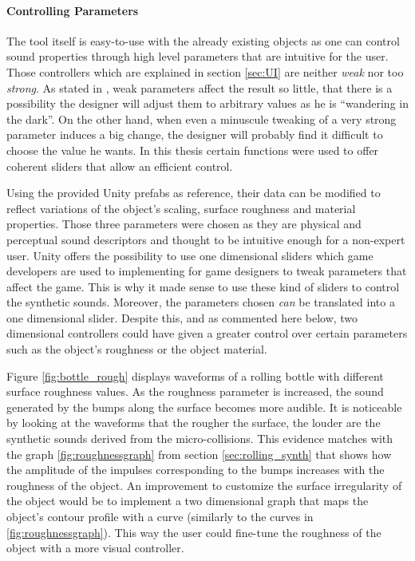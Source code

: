 \paragraph{Controlling Parameters}
\hfill \break

The tool itself is easy-to-use with the already existing objects as one can control sound properties through high level parameters that are intuitive for the user. Those controllers which are explained in section \ref{sec:UI} are neither \textit{weak} nor too \textit{strong}. As stated in \cite{jaffe1995ten}, weak parameters affect the result so little, that there is a possibility the designer will adjust them to arbitrary values as he is ``wandering in the dark''. On the other hand, when even a minuscule tweaking of a very strong parameter induces a big change, the designer will probably find it difficult to choose the value he wants. In this thesis certain functions were used to offer coherent sliders that allow an efficient control.

Using the provided Unity\textsuperscript{\textregistered} prefabs as reference, their data can be modified to reflect variations of the object's scaling, surface roughness and material properties. Those three parameters were chosen as they are physical and perceptual sound descriptors \cite{aramaki2009thinking} and thought to be intuitive enough for a non-expert user. Unity\textsuperscript{\textregistered} offers the possibility to use one dimensional sliders which game developers are used to implementing for game designers to tweak parameters that affect the game. This is why it made sense to use these kind of sliders to control the synthetic sounds. Moreover, the parameters chosen \textit{can} be translated into a one dimensional slider. Despite this, and as commented here below, two dimensional controllers could have given a greater control over certain parameters such as the object's roughness or the object material.


Figure \ref{fig:bottle_rough} displays waveforms of a rolling bottle with different surface roughness values. As the roughness parameter is increased, the sound generated by the bumps along the surface becomes more audible. It is noticeable by looking at the waveforms that the rougher the surface, the louder are the synthetic sounds derived from the micro-collisions. This evidence matches with the graph \ref{fig:roughnessgraph} from section \ref{sec:rolling_synth} that shows how the amplitude of the impulses corresponding to the bumps increases with the roughness of the object. An improvement to customize the surface irregularity of the object would be to implement a two dimensional graph that maps the object's contour profile with a curve (similarly to the curves in \ref{fig:roughnessgraph}). This way the user could fine-tune the roughness of the object with a more visual controller.

